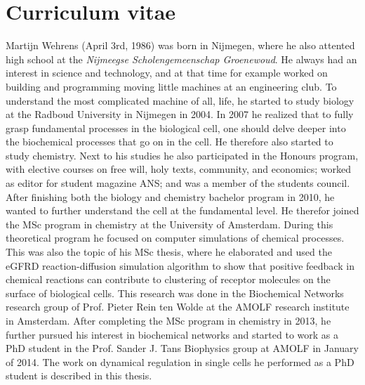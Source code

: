 


\chapter*{Curriculum vitae}


Martijn Wehrens (April 3rd, 1986) was born in Nijmegen, where he also attented high school 
at the \textit{Nijmeegse Scholengemeenschap Groenewoud}.
%
He always had an interest in science and technology, 
and at that time for example worked on building and programming moving little machines at an engineering club.
%
To understand the most complicated machine of all, life, he started to study biology at the Radboud University in Nijmegen in 2004.
%
In 2007 he realized that to fully grasp fundamental processes in the biological cell, 
one should delve deeper into the biochemical processes that go on in the cell.
%
He therefore also started to study chemistry. 
%
Next to his studies he also participated in the Honours program, with elective courses on free will, holy texts, community, and economics; 
worked as editor for student magazine ANS; and was a member of the students council.
%
After finishing both the biology and chemistry bachelor program in 2010, he wanted to further understand the cell at the fundamental level.
%
He therefor joined the MSc program in chemistry at the University of Amsterdam.
%
During this theoretical program he focused on computer simulations of chemical processes.
%
This was also the topic of his MSc thesis, where he elaborated and used the eGFRD reaction-diffusion simulation algorithm to show that 
positive feedback in chemical reactions can contribute to clustering of receptor molecules on the surface of biological cells. 
%
This research was done in the Biochemical Networks research group of Prof. Pieter Rein ten Wolde at the AMOLF research institute in Amsterdam.
%
After completing the MSc program in chemistry in 2013, he further pursued his interest in biochemical networks 
and started to work as a PhD student in the Prof. Sander J. Tans Biophysics group at AMOLF in January of 2014. 
%
The work on dynamical regulation in single cells he performed as a PhD student is described in this thesis.





